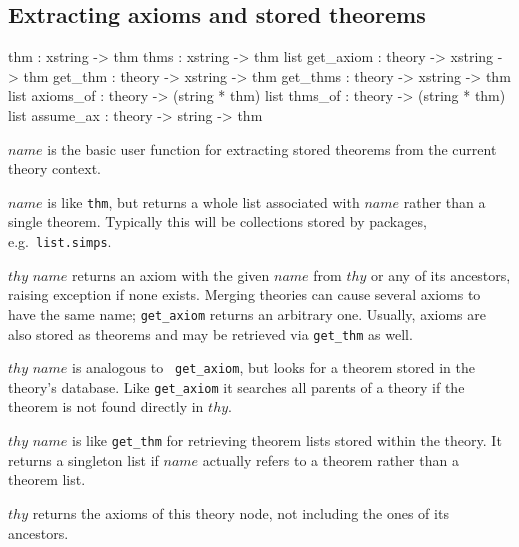 \subsection{Extracting axioms and stored theorems}
\begin{ttbox}
thm       : xstring -> thm
thms      : xstring -> thm list
get_axiom : theory -> xstring -> thm
get_thm   : theory -> xstring -> thm
get_thms  : theory -> xstring -> thm list
axioms_of : theory -> (string * thm) list
thms_of   : theory -> (string * thm) list
assume_ax : theory -> string -> thm
\end{ttbox}
\begin{ttdescription}
  
\item[\ttindexbold{thm} $name$] is the basic user function for
  extracting stored theorems from the current theory context.
  
\item[\ttindexbold{thms} $name$] is like \texttt{thm}, but returns a
  whole list associated with $name$ rather than a single theorem.
  Typically this will be collections stored by packages, e.g.\ 
  \verb|list.simps|.

\item[\ttindexbold{get_axiom} $thy$ $name$] returns an axiom with the
  given $name$ from $thy$ or any of its ancestors, raising exception
  \xdx{THEORY} if none exists.  Merging theories can cause several
  axioms to have the same name; {\tt get_axiom} returns an arbitrary
  one.  Usually, axioms are also stored as theorems and may be
  retrieved via \texttt{get_thm} as well.
  
\item[\ttindexbold{get_thm} $thy$ $name$] is analogous to {\tt
    get_axiom}, but looks for a theorem stored in the theory's
  database.  Like {\tt get_axiom} it searches all parents of a theory
  if the theorem is not found directly in $thy$.
  
\item[\ttindexbold{get_thms} $thy$ $name$] is like \texttt{get_thm}
  for retrieving theorem lists stored within the theory.  It returns a
  singleton list if $name$ actually refers to a theorem rather than a
  theorem list.
  
\item[\ttindexbold{axioms_of} $thy$] returns the axioms of this theory
  node, not including the ones of its ancestors.
  

\end{ttdescription}
